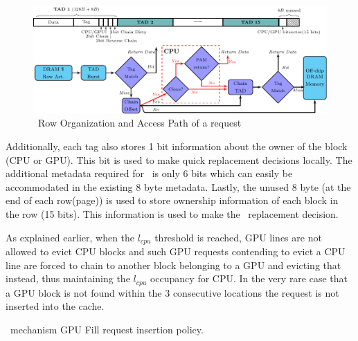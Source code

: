 \begin{figure}[htb]
	\centering
	\includegraphics[scale=1]{figures/chaining}
	\caption{\cachename\ Row Organization and Access Path of a request}	
	\label{fig:chain-access}
\end{figure}

Additionally, each tag also stores 1 bit information about the owner of the block (CPU or GPU). This bit is used to make quick replacement decisions locally. The additional metadata required for \chaining\ is only 6 bits which can easily be accommodated in the existing 8 byte metadata. Lastly, the unused 8 byte (at the end of each row(page)) is used to store ownership information of each block in the row (15 bits). This information is used to make the \chaining\ replacement decision.


\par As explained earlier, when the \textit{$l_{cpu}$} threshold is reached, GPU lines are not allowed to evict CPU blocks and such GPU requests contending to evict a CPU line are forced to chain to another block belonging to a GPU and evicting that instead, thus maintaining the \textit{$l_{cpu}$} occupancy for CPU. In the very rare case that a GPU block is not found within the 3 consecutive locations the request is not inserted into the cache.

\begin{table}[htb]
	\centering
	
	\caption{\chaining\ mechanism GPU Fill request insertion policy. }
	\label{chaining-replacement}
\end{table}

